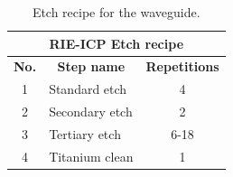 \begin{table}[H]
\centering
\begin{tabular}{ |c|p{4.5cm}|c|  }
    \hline
    \multicolumn{3}{|c|}{\bfseries \gls{RIE}-\gls{ICP} Etch recipe} \\
    \hline
    \bfseries No.&\multicolumn{1}{c|}{\bfseries Step name}& \bfseries Repetitions\\
    \hline
    1&Standard etch & 4\\

    2&Secondary etch & 2\\
    3&Tertiary etch& 6-18\\

    4&Titanium clean& 1\\

\hline
\end{tabular}
\caption[Etch recipe for the developed waveguide]{Etch recipe for the waveguide.}
\label{tab:MC_etch_overview}
\end{table}

